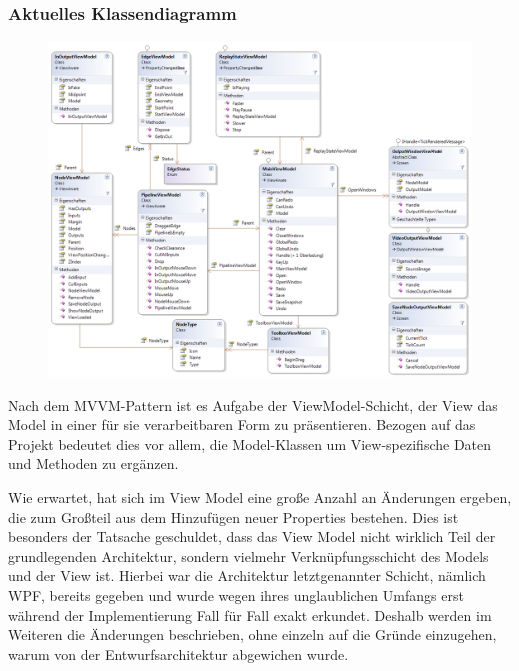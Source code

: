 \subsection{}

\subsubsection*{Aktuelles Klassendiagramm}
\begin{figure}[h!]
\begin{center}
\includegraphics[width=\textwidth]{classdiagram/viewmodel.png}
\end{center}
\end{figure}
Nach dem MVVM-Pattern ist es Aufgabe der ViewModel-Schicht, der View das Model in einer für sie verarbeitbaren Form zu präsentieren. Bezogen auf das Projekt bedeutet dies vor allem, die Model-Klassen um View-spezifische Daten und Methoden zu ergänzen.
\newpage

Wie erwartet, hat sich im View Model eine große Anzahl an Änderungen ergeben, die zum Großteil aus dem Hinzufügen neuer Properties bestehen. Dies ist besonders der Tatsache geschuldet, dass das View Model nicht wirklich Teil der grundlegenden Architektur, sondern vielmehr Verknüpfungsschicht des Models und der View ist. Hierbei war die Architektur letztgenannter Schicht, nämlich WPF, bereits gegeben und  wurde wegen ihres unglaublichen Umfangs erst während der Implementierung Fall für Fall exakt erkundet. Deshalb werden im Weiteren die Änderungen beschrieben, ohne einzeln auf die Gründe einzugehen, warum von der Entwurfsarchitektur abgewichen wurde.

